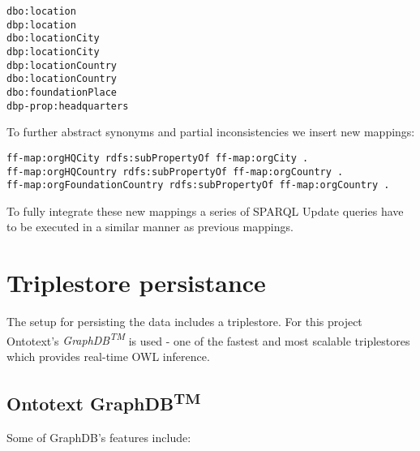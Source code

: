 \begin{enumerate}
\begin{verbatim}
dbo:location	
dbp:location	
dbo:locationCity	
dbp:locationCity	
dbp:locationCountry	
dbo:locationCountry	
dbo:foundationPlace	
dbp-prop:headquarters
\end{verbatim}

To further abstract synonyms and partial inconsistencies we insert new mappings: 

\begin{verbatim}
ff-map:orgHQCity rdfs:subPropertyOf ff-map:orgCity .
ff-map:orgHQCountry rdfs:subPropertyOf ff-map:orgCountry .
ff-map:orgFoundationCountry rdfs:subPropertyOf ff-map:orgCountry .
\end{verbatim}

To fully integrate these new mappings a series of SPARQL Update queries have to be executed in a similar manner as previous mappings.

\end{enumerate}
\section{Triplestore persistance}
The setup for persisting the data includes a triplestore. For this project Ontotext's \textit{GraphDB\textsuperscript{TM}} is used - one of the fastest and most scalable triplestores which provides real-time OWL inference. 

\subsection{Ontotext GraphDB\textsuperscript{TM}}
Some of GraphDB's features include:

